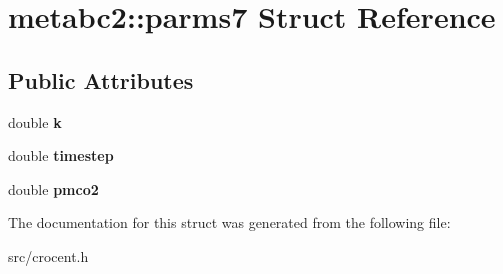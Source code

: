 \hypertarget{structmetabc2_1_1parms7}{\section{metabc2\-:\-:parms7 Struct Reference}
\label{structmetabc2_1_1parms7}
}
\subsection*{Public Attributes}
\begin{DoxyCompactItemize}
\item 
\hypertarget{structmetabc2_1_1parms7_ac61e52925391619cf8d8e506963de1e1}{double {\bfseries k}}\label{structmetabc2_1_1parms7_ac61e52925391619cf8d8e506963de1e1}

\item 
\hypertarget{structmetabc2_1_1parms7_a265757ed6a0a92d9b2acef3c4b98e3e3}{double {\bfseries timestep}}\label{structmetabc2_1_1parms7_a265757ed6a0a92d9b2acef3c4b98e3e3}

\item 
\hypertarget{structmetabc2_1_1parms7_aaa20d2c6490c0b3ca7f18bd297d8203b}{double {\bfseries pmco2}}\label{structmetabc2_1_1parms7_aaa20d2c6490c0b3ca7f18bd297d8203b}

\end{DoxyCompactItemize}


The documentation for this struct was generated from the following file\-:\begin{DoxyCompactItemize}
\item 
src/crocent.\-h\end{DoxyCompactItemize}

